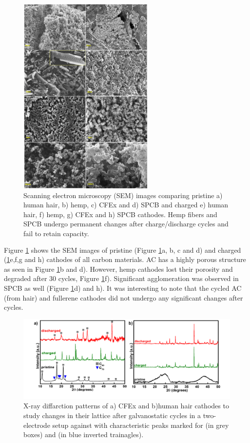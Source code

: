 \begin{figure}[tbh!]
  \centering
  \includegraphics[width=0.6\textwidth]{Figures/chap5fig/SEM}
    \caption{Scanning electron microscopy (SEM) images comparing pristine a) human hair, b) hemp, c) CFEx and d) SPCB and charged e) human hair, f) hemp, g) CFEx and h) SPCB cathodes. Hemp fibers and SPCB undergo permanent changes after charge/discharge cycles and fail to retain capacity.}
  \label{Figures/chap5fig:SEM}
\end{figure}

Figure \ref{Figures/chap5fig:SEM} shows the SEM images of pristine (Figure \ref{Figures/chap5fig:SEM}a, b, c and d) and charged (\ref{Figures/chap5fig:SEM}e,f,g and h) cathodes of all carbon materials. AC has a highly porous structure as seen in Figure \ref{Figures/chap5fig:SEM}b and d). However, hemp cathodes lost their porosity and degraded after 30 cycles, Figure \ref{Figures/chap5fig:SEM}f). Significant agglomeration was observed in SPCB as well (Figure \ref{Figures/chap5fig:SEM}d) and h). It was interesting to note that the cycled AC (from hair) and fullerene cathodes did not undergo any significant changes after cycles. 

\begin{figure}[tbh!]
  \centering
  \includegraphics[width=\textwidth]{Figures/chap5fig/XRD}
    \caption{X-ray diffarction patterns of a) CFEx and b)human hair cathodes to study changes in their lattice after galvanostatic cycles in a two-electrode setup against  with characteristic peaks marked for  (in grey boxes) and  (in blue inverted trainagles).}
  \label{Figures/chap5fig:XRD}
\end{figure}

